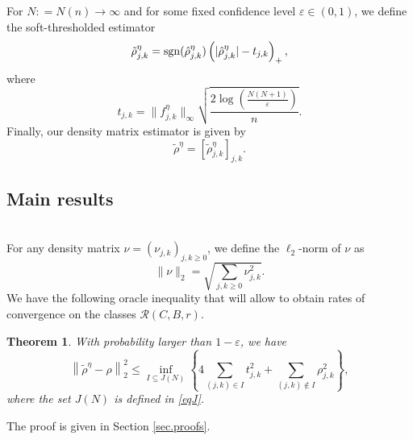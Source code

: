 \documentclass[a4paper]{amsart}
\newtheorem{theorem}{Theorem}[section]
\newcommand{\deq}{\mathrel{\mathop:} = } %
\begin{document}
%
For $N \deq N(n) \rightarrow \infty$ and for some fixed confidence level
$\varepsilon\in(0,1)$, we define the soft-thresholded estimator
        \begin{eqnarray}
        \label{rho-seuil}
        \tilde{\rho}^{\eta}_{j,k} =  {\rm sgn} (\hat{\rho}_{j,k}^{\eta})
         \left(|\hat{\rho}_{j,k}^{\eta}|- t_{j,k} \right)_{+}, 
        \end{eqnarray}
where
       \begin{equation}
      \label{tjk}
       t_{j,k} = \|f_{j,k}^{\eta}\|_{\infty}\sqrt{\frac{
2\log\left(\frac{N(N+1)}{\varepsilon}\right)}{n}}. 
      \end{equation}
Finally, our density matrix estimator is given by
$$\tilde{\rho}^{\eta}=[\tilde{\rho}^{\eta}_{j,k}]_{j,k} .$$




\subsection{Main results}
\label{Main.results}
\noindent\\

For any density matrix $\nu=(\nu_{j,k})_{j,k\geq 0}$, we define the
$\ell_{2}$-norm of $\nu$ as
$$
 \|\nu \|_{2} = \sqrt{ \sum_{j,k\geq 0} \nu_{j,k}^{2} } .
 $$
We have the following oracle inequality that will allow to obtain rates of
convergence on the classes $\mathcal{R}(C,B,r)$.


 \begin{theorem}
           \label{thm.oracle}
           With probability larger than
$1-\varepsilon$, we have
           $$
          \left\|\tilde{\rho}^\eta - \rho \right\|^{2}_{2}  \leq
\inf_{I\subseteq J(N)} \left\{ 4 \sum_
            {(j,k)\in I} t_{j,k}^{2} + \sum_{(j,k)\notin I}\rho_{j,k}^{2}
\right\},
           $$
           where the set $J(N)$ is defined in \eqref{eqJ}.
\end{theorem}
The proof is given in Section \ref{sec.proofs}.
\end{document}
